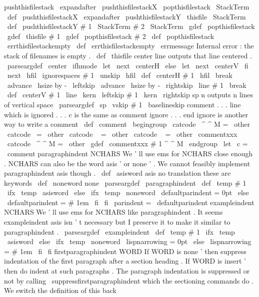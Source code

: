 {pushthisfilestack
{
%
\
expandafter
\
pushthisfilestackX
\
popthisfilestack
\
StackTerm
}
\
def
\
pushthisfilestackX
{
%
\
expandafter
\
pushthisfilestackY
\
thisfile
\
StackTerm
}
\
def
\
pushthisfilestackY
#
1
\
StackTerm
#
2
\
StackTerm
{
%
\
gdef
\
popthisfilestack
{
\
gdef
\
thisfile
{
#
1
}
\
gdef
\
popthisfilestack
{
#
2
}
}
%
}
\
def
\
popthisfilestack
{
\
errthisfilestackempty
}
\
def
\
errthisfilestackempty
{
\
errmessage
{
Internal
error
:
the
stack
of
filenames
is
empty
.
}
}
\
def
\
thisfile
{
}
%
center
line
%
outputs
that
line
centered
.
%
\
parseargdef
\
center
{
%
\
ifhmode
\
let
\
next
\
centerH
\
else
\
let
\
next
\
centerV
\
fi
\
next
{
\
hfil
\
ignorespaces
#
1
\
unskip
\
hfil
}
%
}
\
def
\
centerH
#
1
{
%
{
%
\
hfil
\
break
\
advance
\
hsize
by
-
\
leftskip
\
advance
\
hsize
by
-
\
rightskip
\
line
{
#
1
}
%
\
break
}
%
}
\
def
\
centerV
#
1
{
\
line
{
\
kern
\
leftskip
#
1
\
kern
\
rightskip
}
}
%
sp
n
outputs
n
lines
of
vertical
space
\
parseargdef
\
sp
{
\
vskip
#
1
\
baselineskip
}
%
comment
.
.
.
line
which
is
ignored
.
.
.
%
c
is
the
same
as
comment
%
ignore
.
.
.
end
ignore
is
another
way
to
write
a
comment
\
def
\
comment
{
\
begingroup
\
catcode
\
^
^
M
=
\
other
%
\
catcode
\
=
\
other
\
catcode
\
{
=
\
other
\
catcode
\
}
=
\
other
%
\
commentxxx
}
{
\
catcode
\
^
^
M
=
\
other
\
gdef
\
commentxxx
#
1
^
^
M
{
\
endgroup
}
}
\
let
\
c
=
\
comment
%
paragraphindent
NCHARS
%
We
'
ll
use
ems
for
NCHARS
close
enough
.
%
NCHARS
can
also
be
the
word
asis
'
or
none
'
.
%
We
cannot
feasibly
implement
paragraphindent
asis
though
.
%
\
def
\
asisword
{
asis
}
%
no
translation
these
are
keywords
\
def
\
noneword
{
none
}
%
\
parseargdef
\
paragraphindent
{
%
\
def
\
temp
{
#
1
}
%
\
ifx
\
temp
\
asisword
\
else
\
ifx
\
temp
\
noneword
\
defaultparindent
=
0pt
\
else
\
defaultparindent
=
#
1em
\
fi
\
fi
\
parindent
=
\
defaultparindent
}
%
exampleindent
NCHARS
%
We
'
ll
use
ems
for
NCHARS
like
paragraphindent
.
%
It
seems
exampleindent
asis
isn
'
t
necessary
but
%
I
preserve
it
to
make
it
similar
to
paragraphindent
.
\
parseargdef
\
exampleindent
{
%
\
def
\
temp
{
#
1
}
%
\
ifx
\
temp
\
asisword
\
else
\
ifx
\
temp
\
noneword
\
lispnarrowing
=
0pt
\
else
\
lispnarrowing
=
#
1em
\
fi
\
fi
}
%
firstparagraphindent
WORD
%
If
WORD
is
none
'
then
suppress
indentation
of
the
first
paragraph
%
after
a
section
heading
.
If
WORD
is
insert
'
then
do
indent
at
such
%
paragraphs
.
%
%
The
paragraph
indentation
is
suppressed
or
not
by
calling
%
\
suppressfirstparagraphindent
which
the
sectioning
commands
do
.
%
We
switch
the
definition
of
this
back
}

